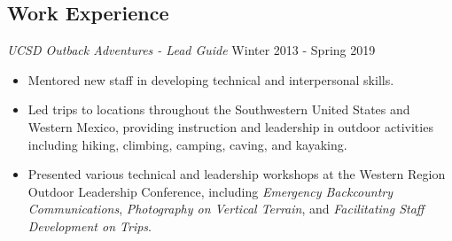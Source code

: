\documentclass[line,margin]{res}
\begin{document}
\begin{resume}

\section{Work Experience}
	{\sl UCSD Outback Adventures - Lead Guide} \hfill Winter 2013 - Spring 2019
	\begin{itemize}
		\item Mentored new staff in developing technical and interpersonal skills.
		\item Led trips to locations throughout the Southwestern United States and Western Mexico, providing instruction and leadership in outdoor activities including hiking, climbing, camping, caving, and kayaking.
		\item Presented various technical and leadership workshops at the Western Region Outdoor Leadership Conference, including \textit{Emergency Backcountry Communications}, \textit{Photography on Vertical Terrain}, and \textit{Facilitating Staff Development on Trips}.
	\end{itemize}


\end{resume}
\end{document}
